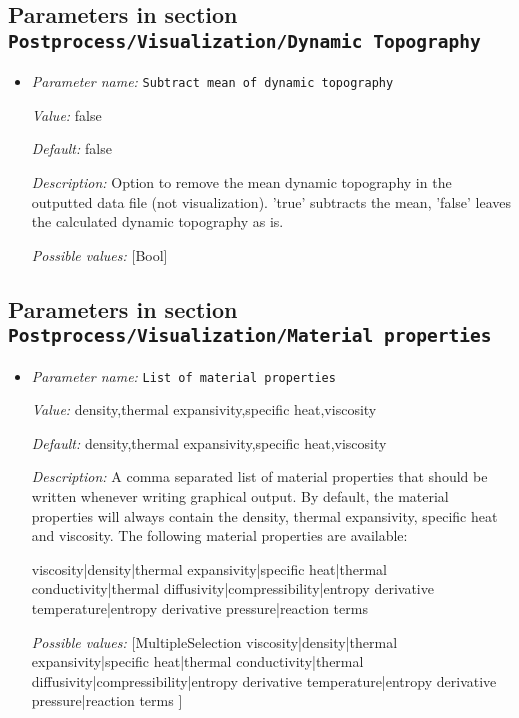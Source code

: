 \subsection{Parameters in section \tt Postprocess/Visualization/Dynamic Topography}
\label{parameters:Postprocess/Visualization/Dynamic_20Topography}

\begin{itemize}
\item {\it Parameter name:} {\tt Subtract mean of dynamic topography}
\label{parameters:Postprocess/Visualization/Dynamic Topography/Subtract mean of dynamic topography}


{\it Value:} false


{\it Default:} false


{\it Description:} Option to remove the mean dynamic topography in the outputted data file (not visualization). 'true' subtracts the mean, 'false' leaves the calculated dynamic topography as is. 


{\it Possible values:} [Bool]
\end{itemize}

\subsection{Parameters in section \tt Postprocess/Visualization/Material properties}
\label{parameters:Postprocess/Visualization/Material_20properties}

\begin{itemize}
\item {\it Parameter name:} {\tt List of material properties}
\label{parameters:Postprocess/Visualization/Material properties/List of material properties}


{\it Value:} density,thermal expansivity,specific heat,viscosity


{\it Default:} density,thermal expansivity,specific heat,viscosity


{\it Description:} A comma separated list of material properties that should be written whenever writing graphical output. By default, the material properties will always contain the density, thermal expansivity, specific heat and viscosity. The following material properties are available:

viscosity|density|thermal expansivity|specific heat|thermal conductivity|thermal diffusivity|compressibility|entropy derivative temperature|entropy derivative pressure|reaction terms


{\it Possible values:} [MultipleSelection viscosity|density|thermal expansivity|specific heat|thermal conductivity|thermal diffusivity|compressibility|entropy derivative temperature|entropy derivative pressure|reaction terms ]
\end{itemize}

